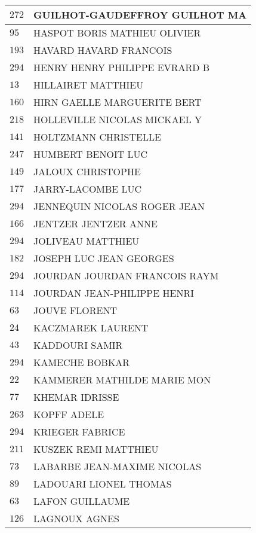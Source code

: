 \begin{xltabular}{\linewidth}{|l|X|}
    \hline
    $272$ & GUILHOT-GAUDEFFROY GUILHOT MA \\
    \hline
    $95$ & HASPOT BORIS MATHIEU OLIVIER \\
    \hline
    $193$ & HAVARD HAVARD FRANCOIS \\
    \hline
    $294$ & HENRY HENRY PHILIPPE EVRARD B \\
    \hline
    $13$ & HILLAIRET MATTHIEU \\
    \hline
    $160$ & HIRN GAELLE MARGUERITE BERT \\
    \hline
    $218$ & HOLLEVILLE NICOLAS MICKAEL Y \\
    \hline
    $141$ & HOLTZMANN CHRISTELLE \\
    \hline
    $247$ & HUMBERT BENOIT LUC \\
    \hline
    $149$ & JALOUX CHRISTOPHE \\
    \hline
    $177$ & JARRY-LACOMBE LUC \\
    \hline
    $294$ & JENNEQUIN NICOLAS ROGER JEAN \\
    \hline
    $166$ & JENTZER JENTZER ANNE \\
    \hline
    $294$ & JOLIVEAU MATTHIEU \\
    \hline
    $182$ & JOSEPH LUC JEAN GEORGES \\
    \hline
    $294$ & JOURDAN JOURDAN FRANCOIS RAYM \\
    \hline
    $114$ & JOURDAN JEAN-PHILIPPE HENRI \\
    \hline
    $63$ & JOUVE FLORENT \\
    \hline
    $24$ & KACZMAREK LAURENT \\
    \hline
    $43$ & KADDOURI SAMIR \\
    \hline
    $294$ & KAMECHE BOBKAR \\
    \hline
    $22$ & KAMMERER MATHILDE MARIE MON \\
    \hline
    $77$ & KHEMAR IDRISSE \\
    \hline
    $263$ & KOPFF ADELE \\
    \hline
    $294$ & KRIEGER FABRICE \\
    \hline
    $211$ & KUSZEK REMI MATTHIEU \\
    \hline
    $73$ & LABARBE JEAN-MAXIME NICOLAS \\
    \hline
    $89$ & LADOUARI LIONEL THOMAS \\
    \hline
    $63$ & LAFON GUILLAUME \\
    \hline
    $126$ & LAGNOUX AGNES \\

\end{xltabular}
